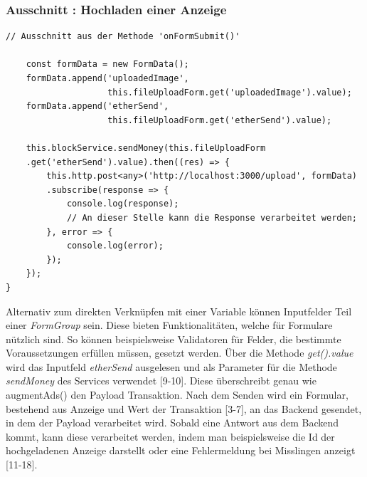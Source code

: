 \subsubsection{Ausschnitt : Hochladen einer Anzeige}
\begin{lstlisting}[caption={Hochladen einer Anzeige im Frontend},captionpos=b]
	// Ausschnitt aus der Methode 'onFormSubmit()'
	
	const formData = new FormData();
	formData.append('uploadedImage', 
					this.fileUploadForm.get('uploadedImage').value);
	formData.append('etherSend', 
					this.fileUploadForm.get('etherSend').value);
	
	this.blockService.sendMoney(this.fileUploadForm
	.get('etherSend').value).then((res) => {
		this.http.post<any>('http://localhost:3000/upload', formData)
		.subscribe(response => {
			console.log(response);
			// An dieser Stelle kann die Response verarbeitet werden;
		}, error => {
			console.log(error);
		});
	});
}
\end{lstlisting}
Alternativ zum direkten Verknüpfen mit einer Variable können Inputfelder Teil einer \emph{FormGroup} sein. Diese bieten Funktionalitäten, welche für Formulare nützlich sind. 
So können beispielsweise Validatoren für Felder, die bestimmte Voraussetzungen erfüllen müssen, gesetzt werden.
Über die Methode \emph{get().value} wird das Inputfeld \emph{etherSend} ausgelesen und als Parameter für die Methode \emph{sendMoney} des Services verwendet [9-10]. Diese überschreibt genau wie augmentAds() den Payload Transaktion. Nach dem Senden wird ein Formular, bestehend aus Anzeige und Wert der Transaktion [3-7], an das Backend gesendet, in dem der Payload verarbeitet wird. Sobald eine Antwort aus dem Backend kommt, kann diese verarbeitet werden, indem man beispielsweise die Id der hochgeladenen Anzeige darstellt oder eine Fehlermeldung bei Misslingen anzeigt [11-18].
